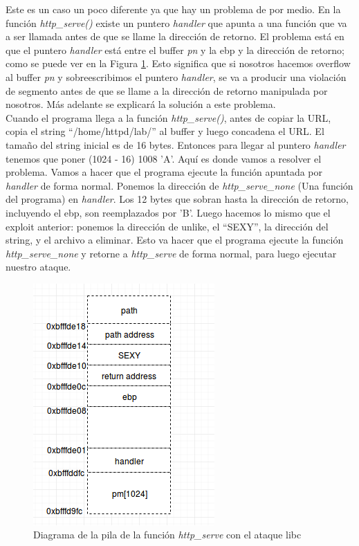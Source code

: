 \documentclass[a4paper,12pt]{article}
\begin{document}
Este es un caso un poco diferente ya que hay un problema de por medio. En la función \textit{http\_serve()} existe un puntero
\textit{handler} que apunta a una función que va a ser llamada antes de que se llame la dirección de retorno. El problema está
en que el puntero \textit{handler} está entre el buffer \textit{pn} y la ebp y la dirección de retorno; como se puede ver en
la Figura \ref{fig:pila3}. Esto significa que si nosotros hacemos overflow al buffer \textit{pn} y sobreescribimos el puntero
\textit{handler}, se va a producir una violación de segmento antes de que se llame a la dirección de retorno manipulada
por nosotros. Más adelante se explicará la solución a este problema.\\
Cuando el programa llega a la función \textit{http\_serve()}, antes de copiar la URL, copia el string ``/home/httpd/lab/'' al
buffer y luego concadena el URL. El tamaño del string inicial es de 16 bytes. Entonces para llegar al puntero \textit{handler}
tenemos que poner (1024 - 16) 1008 'A'. Aquí es donde vamos a resolver el problema. Vamos a hacer que el programa ejecute la
función apuntada por \textit{handler} de forma normal. Ponemos la dirección de \textit{http\_serve\_none} (Una función del programa)
en \textit{handler}. Los 12 bytes que sobran hasta la dirección de retorno, incluyendo el ebp, son reemplazados por 'B'.
Luego hacemos lo mismo que el exploit anterior: ponemos la dirección de unlike, el ``SEXY'', la dirección del string, y el
archivo a eliminar. Esto va hacer que el programa ejecute la función \textit{http\_serve\_none} y retorne a \textit{http\_serve}
de forma normal, para luego ejecutar nuestro ataque.


\begin{figure}
 \centering
 \includegraphics[scale = 0.7]{pila3.png}
 \caption{Diagrama de la pila de la función \textit{http\_serve} con el ataque libc}
 \label{fig:pila3}
\end{figure}
\end{document}
